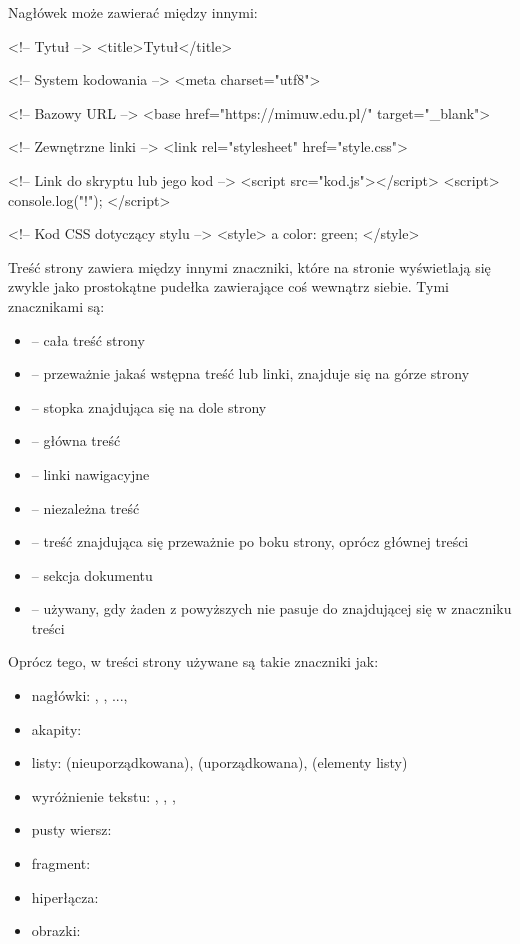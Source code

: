 Nagłówek może zawierać między innymi:
\begin{html}
<!-- Tytuł -->
<title>Tytuł</title>

<!-- System kodowania -->
<meta charset="utf8">

<!-- Bazowy URL -->
<base href="https://mimuw.edu.pl/" target="_blank">

<!-- Zewnętrzne linki -->
<link rel="stylesheet" href="style.css">

<!-- Link do skryptu lub jego kod -->
<script src="kod.js"></script>
<script> console.log("!"); </script>

<!-- Kod CSS dotyczący stylu -->
<style> a {color: green;} </style>
\end{html}

Treść strony zawiera między innymi znaczniki, które na stronie wyświetlają się zwykle jako prostokątne pudełka zawierające coś wewnątrz siebie. Tymi znacznikami są:
\begin{itemize}
    \item {} -- cała treść strony
    \item {} -- przeważnie jakaś wstępna treść lub linki, znajduje się na górze strony
    \item {} -- stopka znajdująca się na dole strony
    \item {} -- główna treść
    \item {} -- linki nawigacyjne
    \item {} -- niezależna treść
    \item {} -- treść znajdująca się przeważnie po boku strony, oprócz głównej treści
    \item {} -- sekcja dokumentu
    \item {} -- używany, gdy żaden z powyższych nie pasuje do znajdującej się w znaczniku treści
\end{itemize}

Oprócz tego, w treści strony używane są takie znaczniki jak:
\begin{itemize}
    \item nagłówki: , , ..., 
    \item akapity: 
    \item listy:  (nieuporządkowana),  (uporządkowana),  (elementy listy)
    \item wyróżnienie tekstu: , , , 
    \item pusty wiersz: 
    \item fragment: 
    \item hiperłącza: 
    \item obrazki: 
\end{itemize}

